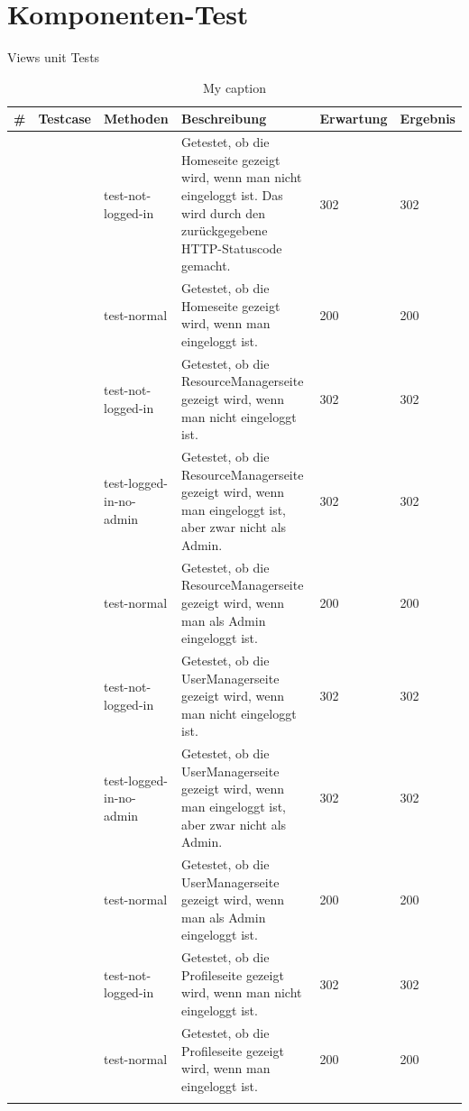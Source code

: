 \documentclass[parskip=full,11pt]{scrartcl}
\begin{document}
 \newpage
\section{Komponenten-Test}
Views unit Tests

\begin{longtable}[c]{|p{0.4cm}|p{2.5cm}|p{3.5cm}|p{5cm}|p{2cm}|p{1.8cm}|}
\caption{My caption}
\label{my-label}\\
\hline
\textbf{\#} & \textbf{Testcase}&\textbf{Methoden}& \textbf{Beschreibung} & \textbf{Erwartung} & \textbf{Ergebnis} \\ \hline
\endfirsthead
%
\endhead
%
\multirow{2}{*}{}1 & \multirow{2}{*}{} TestHomeView & test-not-logged-in & Getestet, ob die Homeseite gezeigt wird, wenn man nicht eingeloggt ist. Das wird durch den zurückgegebene HTTP-Statuscode gemacht.& 302  & 302 \\ \cline{3-6} &   & test-normal & Getestet, ob die Homeseite gezeigt wird, wenn man eingeloggt ist.  & 200 & 200 \\ \hline
\multirow{3}{*}{} 2& \multirow{3}{*}{} TestResourceManager&  test-not-logged-in & Getestet, ob die ResourceManagerseite gezeigt wird, wenn man nicht eingeloggt ist. & 302  & 302  \\ \cline{3-6} & & test-logged-in-no-admin & Getestet, ob die ResourceManagerseite gezeigt wird, wenn man eingeloggt ist, aber zwar nicht als Admin. & 302 & 302 \\ \cline{3-6} & & test-normal & Getestet, ob die ResourceManagerseite gezeigt wird, wenn man als Admin  eingeloggt ist. & 200 & 200  \\ \hline
\multirow{3}{*}{} 3& \multirow{3}{*}{} TestUserManager&  test-not-logged-in & Getestet, ob die UserManagerseite gezeigt wird, wenn man nicht eingeloggt ist. & 302  & 302  \\ \cline{3-6} & & test-logged-in-no-admin & Getestet, ob die UserManagerseite gezeigt wird, wenn man eingeloggt ist, aber zwar nicht als Admin. & 302 & 302 \\ \cline{3-6} & & test-normal & Getestet, ob die UserManagerseite gezeigt wird, wenn man als Admin  eingeloggt ist. & 200 & 200  \\ \hline
\multirow{5}{*}{} 4& \multirow{5}{*}{} TestProfileView& test-not-logged-in & Getestet, ob die Profileseite gezeigt wird, wenn man nicht eingeloggt ist.& 302  & 302 \\ \cline{3-6} &   & test-normal & Getestet, ob die Profileseite gezeigt wird, wenn man eingeloggt ist.  & 200 & 200 \\ \cline{3-6} 

\end{longtable}
\end{document}
